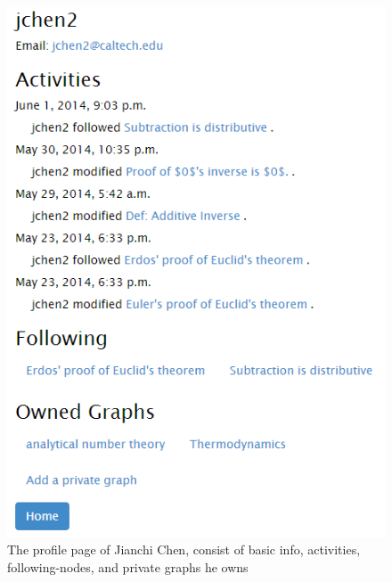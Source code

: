 \documentclass{acm_proc_article-sp}
\begin{document}
\begin{itemize}
\begin{figure}[h!]
\centering
\includegraphics[scale=0.52]{profile.png}
\caption{The profile page of Jianchi Chen, consist of basic info, activities, following-nodes, and private graphs he owns}
\end{figure}\\


\end{itemize}
\end{document}
